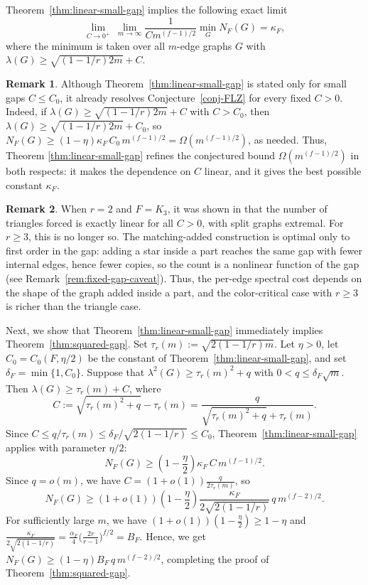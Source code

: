 \documentclass[11pt,a4paper]{article}
\theoremstyle{definition}
\newtheorem{remark}{Remark}
\theoremstyle{plain}
\newcommand{\Ksharp}{\kappa_{F}}
\renewcommand{\le}{\leqslant}
\renewcommand{\ge}{\geqslant}
\begin{document}
Theorem~\ref{thm:linear-small-gap} implies the following exact limit
\begin{equation}\label{eq:exact-limit}
  \lim_{C\to 0^+}\ \lim_{m\to\infty} 
  \frac{1}{C m^{(f-1)/2}} \min_{G} N_F (G) =\Ksharp,
\end{equation}
where the minimum is taken over all $m$-edge graphs $G$ with $\lambda(G)\ge\sqrt{(1\!-\!1/r)2m}+C$.

\begin{remark}\label{rem:large-gap}
Although Theorem~\ref{thm:linear-small-gap} is stated only for small gaps $C\le C_0$, it already resolves Conjecture~\ref{conj-FLZ} for every fixed $C>0$. Indeed, if $\lambda(G)\ge \sqrt{(1\!-\!1/r)2m}+C$ with $C>C_0$, then $\lambda(G)\ge \sqrt{(1\!-\!1/r)2m}+C_0$, so $ N_F (G)\ge(1-\eta)\Ksharp\,C_0\,m^{(f-1)/2}=\Omega(m^{(f-1)/2})$, as needed. Thus, 
Theorem \ref{thm:linear-small-gap} 
refines the conjectured bound $\Omega(m^{(f-1)/2})$ in both respects: it makes the dependence on $C$ linear, and it gives the best possible constant $\kappa_F$. 
\end{remark}

\begin{remark}
When $r=2$ and $F=K_3$, it was shown in \cite{CLT2026} that the
number of triangles forced is exactly linear for all $C>0$, with split
graphs extremal. For $r\ge3$, this is no longer so. The matching-added construction 
is optimal only to first order in the gap: adding a star inside a part reaches the same gap with fewer internal edges, hence fewer
copies, so the count is a nonlinear function of the
gap (see Remark~\ref{rem:fixed-gap-caveat}). Thus, the per-edge spectral cost depends
on the shape of the graph added inside a part, and the color-critical
case with $r\ge3$ is richer than the triangle case. 
\end{remark}

Next, we show that
Theorem~\ref{thm:linear-small-gap}
immediately implies
Theorem~\ref{thm:squared-gap}. Set 
$\tau_r(m):=\sqrt{2(1 \!-\!1/r)m}$. 
Let $\eta>0$, let $C_0=C_0(F,\eta/2)$ be the
constant of
Theorem~\ref{thm:linear-small-gap}, and set
$\delta_F=\min\{1,C_0\}$. Suppose that
$\lambda^2(G)\ge\tau_r(m)^2+q$ with
$0<q\le\delta_F\sqrt m$. Then
$\lambda(G)\ge\tau_r(m)+C$,  where 
\begin{equation*} 
  C:=\sqrt{\tau_r(m)^2+q}-\tau_r(m)
       =\frac{q}{\sqrt{\tau_r(m)^2+q}+\tau_r(m)}.
\end{equation*}
 Since
$C\le q/\tau_r(m)
   \le\delta_F/\sqrt{2(1-1/r)}\le C_0$,
Theorem~\ref{thm:linear-small-gap} applies
with parameter $\eta/2$:
\[
  N_F(G)\ge\left(1-\frac{\eta}{2}\right)
           \Ksharp\,C\,m^{(f-1)/2}.
\]
Since $q=o(m)$, we have
$C=(1+o(1))\tfrac{q}{2\tau_r(m)}$, so
\[
  N_F(G)\ge(1+o(1))\left(1-\frac{\eta}{2}\right)
   \frac{\Ksharp}{2\sqrt{2(1-1/r)}}
   \,q\,m^{(f-2)/2}.
\]
For sufficiently large $m$, we have 
$(1+o(1))(1-\tfrac{\eta}{2})\ge1-\eta$ and
$\tfrac{\Ksharp}{2\sqrt{2(1-1/r)}}
  =\tfrac{\alpha_F}{4}
   \bigl(\tfrac{2r}{r-1}\bigr)^{f/2}=B_F$.
Hence, we get $N_F(G)\ge(1-\eta)B_F\,q\,m^{(f-2)/2}$,
completing the proof of
Theorem~\ref{thm:squared-gap}.
\end{document}
